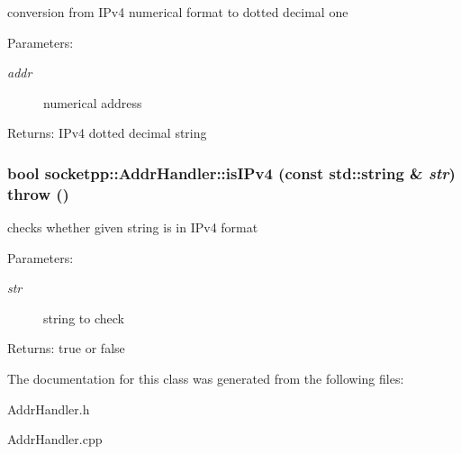 conversion from IPv4 numerical format to dotted decimal one 

\begin{Desc}
\item[Parameters:]
\begin{description}
\item[{\em addr}]numerical address \end{description}
\end{Desc}
\begin{Desc}
\item[Returns:]IPv4 dotted decimal string \end{Desc}
\hypertarget{classsocketpp_1_1AddrHandler_652e24c273f7905cebf8d04b3cfef74d}{
\subsubsection[{isIPv4}]{\setlength{\rightskip}{0pt plus 5cm}bool socketpp::AddrHandler::isIPv4 (const std::string \& {\em str})  throw ()}}
\label{classsocketpp_1_1AddrHandler_652e24c273f7905cebf8d04b3cfef74d}


checks whether given string is in IPv4 format 

\begin{Desc}
\item[Parameters:]
\begin{description}
\item[{\em str}]string to check \end{description}
\end{Desc}
\begin{Desc}
\item[Returns:]true or false \end{Desc}


The documentation for this class was generated from the following files:\begin{CompactItemize}
\item 
AddrHandler.h\item 
AddrHandler.cpp\end{CompactItemize}
